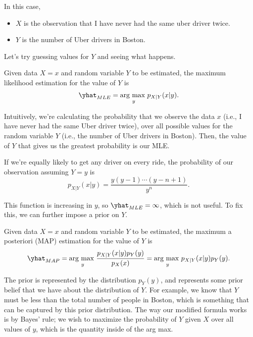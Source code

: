 In this case, 
\begin{itemize}
    \item $X$ is the observation that I have never had the same uber driver twice.
    \item $Y$ is the number of Uber drivers in Boston.
\end{itemize}

Let's try guessing values for $Y$ and seeing what happens. 

\begin{definition}

Given data $X=x$ and random variable $Y$ to be estimated, the \ac{maximum likelihood estimation} for the value of $Y$ is 
\[\yhat_{MLE} = \underset{y}{\text{arg max }}p_{X\vert Y}(x\vert y).\]
\end{definition}

Intuitively, we're calculating the probability that we observe the data $x$ (i.e., I have never had the same Uber driver twice), over all possible values for the random variable $Y$ (i.e., the number of Uber drivers in Boston). Then, the value of $Y$ that gives us the greatest probability is our MLE. 

If we're equally likely to get any driver on every ride, the probability of our observation assuming $Y=y$ is 
\[p_{X\vert Y}(x\vert y) = \frac{y(y-1)\cdots (y-n+1)}{y^n}.\]

This function is increasing in $y$, so $\yhat_{MLE}=\infty$, which is not useful. To fix this, we can further impose a \ac{prior} on $Y$. 

\begin{definition}

Given data $X=x$ and random variable $Y$ to be estimated, the \ac{maximum a posteriori} (MAP) estimation for the value of $Y$ is 
\[\yhat_{MAP} = \underset{y}{\text{arg max }}\frac{p_{X\vert Y}(x\vert y)p_Y(y)}{p_X(x)} = \underset{y}{\text{arg max }}p_{X\vert Y}(x\vert y)p_Y(y).\]
\end{definition}

The prior is represented by the distribution $p_{Y}(y)$, and represents some prior belief that we have about the distribution of $Y$. For example, we know that $Y$ must be less than the total number of people in Boston, which is something that can be captured by this prior distribution. The way our modified formula works is by Bayes' rule; we wish to maximize the probability of $Y$ given $X$ over all values of $y$, which is the quantity inside of the arg max. 


